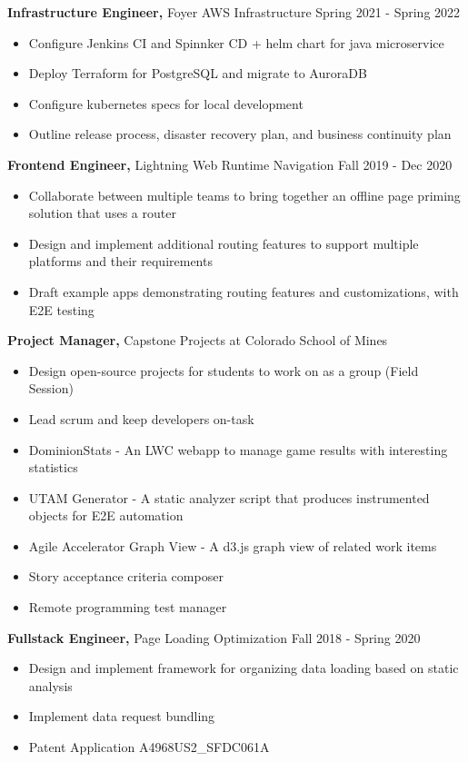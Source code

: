\documentclass[12pt]{res}
\begin{document}
\begin{resume}
{\bf Infrastructure Engineer,} Foyer AWS Infrastructure \hfill Spring 2021 - Spring 2022
\begin{itemize} \itemsep -2pt
    \item Configure Jenkins CI and Spinnker CD + helm chart for java microservice
    \item Deploy Terraform for PostgreSQL and migrate to AuroraDB
    \item Configure kubernetes specs for local development
    \item Outline release process, disaster recovery plan, and business continuity plan
\end{itemize}

{\bf Frontend Engineer,} Lightning Web Runtime Navigation \hfill Fall 2019 - Dec 2020
\begin{itemize} \itemsep -2pt
    \item Collaborate between multiple teams to bring together an offline page priming solution that uses a router
    \item Design and implement additional routing features to support multiple platforms and their requirements
    \item Draft example apps demonstrating routing features and customizations, with E2E testing
\end{itemize}

{\bf Project Manager,} Capstone Projects at Colorado School of Mines
\begin{itemize} \itemsep -2pt
    \item Design open-source projects for students to work on as a group (Field Session)
    \item Lead scrum and keep developers on-task
    \item DominionStats - An LWC webapp to manage game results with interesting statistics
    \item UTAM Generator - A static analyzer script that produces instrumented objects for E2E automation
    \item Agile Accelerator Graph View - A d3.js graph view of related work items
    \item Story acceptance criteria composer
    \item Remote programming test manager
\end{itemize}

{\bf Fullstack Engineer,} Page Loading Optimization \hfill Fall 2018 - Spring 2020
\begin{itemize} \itemsep -2pt
    \item Design and implement framework for organizing data loading based on static analysis
    \item Implement data request bundling
    \item Patent Application A4968US2\_SFDC061A
\end{itemize}


\end{resume}
\end{document}
